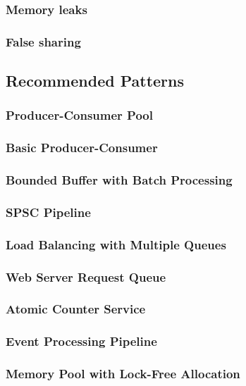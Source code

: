 \documentclass[12pt, letterpaper]{article}
\begin{document}
	\subsubsection{Memory leaks}
	\subsubsection{False sharing}
	\subsection{Recommended Patterns}
	\subsubsection{Producer-Consumer Pool}
	\subsubsection{Basic Producer-Consumer}
	\subsubsection{Bounded Buffer with Batch Processing}
	\subsubsection{SPSC Pipeline}
	\subsubsection{Load Balancing with Multiple Queues}
	\subsubsection{Web Server Request Queue}
	\subsubsection{Atomic Counter Service}
	\subsubsection{Event Processing Pipeline}
	\subsubsection{Memory Pool with Lock-Free Allocation}
	
	\printbibliography
\end{document}
